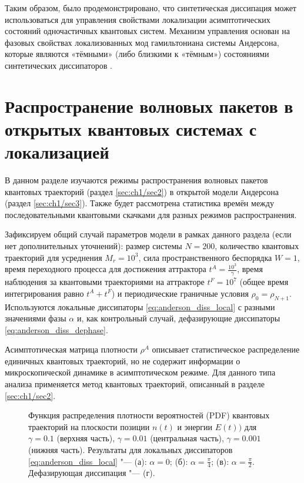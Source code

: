 Таким образом, было продемонстрировано, что синтетическая диссипация может использоваться для управления свойствами локализации асимптотических состояний одночастичных квантовых систем. Механизм управления основан на фазовых свойствах локализованных мод гамильтониана системы Андерсона, которые являются  «тёмными» (либо близкими к «тёмным») состояниями синтетических диссипаторов \cite{Vershinina2017}.

\section{Распространение волновых пакетов в открытых квантовых системах с локализацией}\label{sec:ch1/prb_jump}
В данном разделе изучаются режимы распространения волновых пакетов квантовых траекторий \cite{Dalibard1992, Dum1992, Plenio1998} (раздел \cref{sec:ch1/sec2}) в открытой модели Андерсона (раздел \cref{sec:ch1/sec3}). Также будет рассмотрена статистика времён между последовательными квантовыми скачками для разных режимов распространения.

Зафиксируем общий случай параметров модели в рамках данного раздела (если нет дополнительных уточнений): размер системы \(N=200\), количество квантовых траекторий для усреднения \(M_r=10^3\), сила пространственного беспорядка \(W=1\), время переходного процесса для достижения аттрактора \(t^A = \frac{10^3}{\gamma}\), время наблюдения за квантовыми траекториями на аттракторе \(t^F = 10^7\) (общее время интегрирования равно \(t^A + t^F\)) и периодические граничные условия \(\rho_0 = \rho_{N+1}\). Используются локальные диссипаторы \cref{eq:anderson_diss_local} с разными значениями фазы \(\alpha\) и, как контрольный случай, дефазирующие диссипаторы \cref{eq:anderson_diss_dephase}.

Асимптотическая матрица плотности \(\rho^A\) описывает статистическое распределение единичных квантовых траекторий, но не содержит информации о микроскопической динамике в асимптотическом режиме. Для данного типа анализа применяется метод квантовых траекторий, описанный в разделе \cref{sec:ch1/sec2}.

\begin{figure}[ht]
	\legend{}
	\caption[Этот текст попадает в названия рисунков в списке рисунков]
	{
		Функция распределения плотности вероятностей (PDF) квантовых траекторий на плоскости позиции \(n(t)\) и энергии \(E(t))\) для \(\gamma=0.1\) (верхняя часть),  \(\gamma=0.01\) (центральная часть),  \(\gamma=0.001\) (нижняя часть). Результаты для локальных диссипаторов \cref{eq:anderson_diss_local} "--- (а): \(\alpha=0\); (б): \(\alpha=\frac{\pi}{4}\); (в): \(\alpha=\frac{\pi}{2}\). Дефазирующая диссипация "--- (г).
	}
	\label{fig:anderson_prb_1}
\end{figure}

